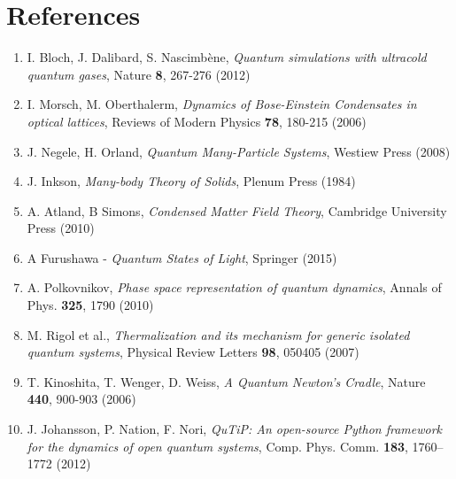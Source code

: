 \documentclass[a4paper,10pt]{article}
\begin{document}
\section*{References}
\begin{enumerate}
 \item I. Bloch, J. Dalibard, S. Nascimbène, \textit{Quantum simulations with ultracold quantum gases}, Nature \textbf{8}, 267-276 (2012)\\
 \item I. Morsch, M. Oberthalerm, \textit{Dynamics of Bose-Einstein Condensates in optical lattices}, Reviews of Modern Physics \textbf{78}, 180-215 (2006)\\
 \item J. Negele, H. Orland, \textit{Quantum Many-Particle Systems}, Westiew Press (2008)\\
 \item J. Inkson, \textit{Many-body Theory of Solids}, Plenum Press (1984) \\
 \item A. Atland, B Simons, \textit{Condensed Matter Field Theory}, Cambridge University Press  (2010)\\
 \item A Furushawa - \textit{Quantum States of Light}, Springer (2015)\\
 \item A. Polkovnikov, \textit{Phase space representation of quantum dynamics}, Annals of Phys. \textbf{325}, 1790 (2010)\\
 \item M. Rigol et al., \textit{Thermalization and its mechanism for generic isolated quantum systems}, Physical Review Letters \textbf{98}, 050405 (2007)\\
 \item T. Kinoshita, T. Wenger, D. Weiss, \textit{A Quantum Newton's Cradle}, Nature \textbf{440}, 900-903 (2006)\\
 \item J. Johansson, P. Nation, F. Nori, \textit{QuTiP: An open-source Python framework for the dynamics of open quantum systems}, Comp. Phys. Comm. \textbf{183}, 1760–1772 (2012)\\
\end{enumerate}

\end{document}
